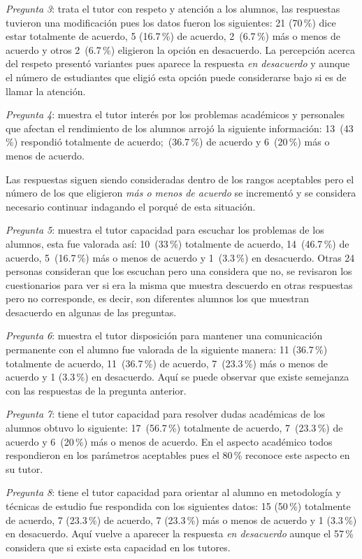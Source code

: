 \textit{Pregunta 3}: trata el tutor con respeto y atención a los alumnos,
las respuestas tuvieron una modificación pues los datos fueron los
siguientes: 21 (70\,\%) dice estar totalmente de acuerdo, 5 (16.7\,\%) de
acuerdo, 2~(6.7\,\%) más o menos de acuerdo y otros 2~(6.7\,\%) eligieron la opción en
desacuerdo. La percepción acerca del respeto  presentó variantes pues
aparece la respuesta \textit{en desacuerdo} y aunque el número de
estudiantes que eligió esta opción puede considerarse bajo si es de llamar
la atención.


\textit{Pregunta 4}: muestra el tutor interés por los problemas
académicos y personales que afectan el rendimiento de los alumnos arrojó la
siguiente información: 13~(43\,\%) respondió totalmente de acuerdo;~(36.7\,\%) 
de acuerdo y 6~(20\,\%) más o menos de acuerdo.


Las respuestas siguen siendo consideradas dentro de los rangos aceptables
pero el número de los que eligieron \textit{más o menos de acuerdo} se
incrementó y se considera necesario continuar indagando el porqué de esta
situación.


\textit{Pregunta 5}: muestra el tutor capacidad para escuchar los
problemas de los alumnos, esta fue valorada así: 10~(33\,\%) totalmente de
acuerdo, 14~(46.7\,\%) de acuerdo, 5~(16.7\,\%) más o menos de acuerdo y 1~(3.3\,\%) en desacuerdo. Otras 24 personas consideran que los escuchan pero una
considera que no, se revisaron los cuestionarios para ver si era la misma
que muestra descuerdo en otras respuestas pero no corresponde, es decir,
son diferentes alumnos los que muestran desacuerdo en algunas de las
preguntas.


\textit{Pregunta 6}: muestra el tutor disposición para mantener una
comunicación permanente con el alumno fue valorada de la siguiente manera:
11 (36.7\,\%) totalmente de acuerdo, 11~(36.7\,\%) de acuerdo, 7~(23.3\,\%) más o
menos de acuerdo y 1 (3.3\,\%) en desacuerdo. Aquí se puede observar que
existe semejanza con las respuestas de la pregunta \mbox{anterior}.
\newpage

\textit{Pregunta 7}: tiene el tutor capacidad para resolver dudas
académicas de los alumnos obtuvo lo siguiente: 17~(56.7\,\%) totalmente de
acuerdo, 7~(23.3\,\%) de acuerdo y 6~(20\,\%) más o menos de acuerdo. En el
aspecto académico todos respondieron en los parámetros aceptables pues el
80\,\% reconoce este aspecto en su tutor.


\textit{Pregunta 8}: tiene el tutor capacidad para orientar al alumno en
metodología y técnicas de estudio fue respondida con los siguientes datos:
15 (50\,\%) totalmente de acuerdo, 7 (23.3\,\%) de acuerdo, 7 (23.3\,\%) más o
menos de acuerdo y 1 (3.3\,\%) en desacuerdo. Aquí vuelve a aparecer la
respuesta \textit{en desacuerdo} aunque el 57\,\% considera que si existe
esta capacidad en los tutores.


